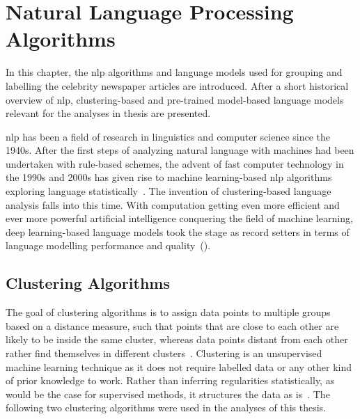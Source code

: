 \renewcommand{\imagepath}{../30-algorithms/img}

\chapter{Natural Language Processing Algorithms}\label{ch:algorithms}
In this chapter, the \gls{nlp} algorithms and language models used for grouping and labelling the celebrity newspaper articles are introduced. After a short historical overview of \gls{nlp}, clustering-based and pre-trained model-based language models relevant for the analyses in thesis are presented.


\gls{nlp} has been a field of research in linguistics and computer science since the 1940s. After the first steps of analyzing natural language with machines had been undertaken with rule-based schemes, the advent of fast computer technology in the 1990s and 2000s has given rise to machine learning-based \gls{nlp} algorithms exploring language statistically~\autocite{jurafsky_speech_2008}. The invention of clustering-based language analysis falls into this time. With computation getting even more efficient and ever more powerful artificial intelligence conquering the field of machine learning, deep learning-based language models took the stage as record setters in terms of language modelling performance and quality~(\cite{vajjala_practical_2020}).


\section{Clustering Algorithms}\label{ch:clustering_algorithms}
The goal of clustering algorithms is to assign data points to multiple groups based on a distance measure, such that points that are close to each other are likely to be inside the same cluster, whereas data points distant from each other rather find themselves in different clusters~\autocite{everitt_cluster_2011,jain_algorithms_1988}. Clustering is an unsupervised machine learning technique as it does not require labelled data or any other kind of prior knowledge to work. Rather than inferring regularities statistically, as would be the case for supervised methods, it structures the data as is~\autocite{xu_survey_2005}. The following two clustering algorithms were used in the analyses of this thesis.


